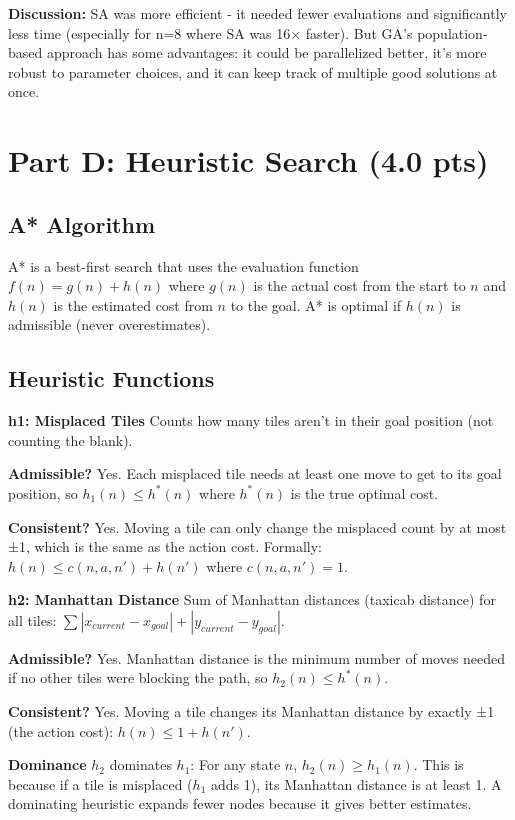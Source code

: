 \documentclass[letterpaper]{article}
\begin{document}
\textbf{Discussion:} SA was more efficient - it needed fewer evaluations and significantly less time (especially for n=8 where SA was 16× faster). But GA's population-based approach has some advantages: it could be parallelized better, it's more robust to parameter choices, and it can keep track of multiple good solutions at once.

\section{Part D: Heuristic Search (4.0 pts)}

\subsection{A* Algorithm}

A* is a best-first search that uses the evaluation function $f(n) = g(n) + h(n)$ where $g(n)$ is the actual cost from the start to $n$ and $h(n)$ is the estimated cost from $n$ to the goal. A* is optimal if $h(n)$ is admissible (never overestimates).

\subsection{Heuristic Functions}

\textbf{h1: Misplaced Tiles} Counts how many tiles aren't in their goal position (not counting the blank).

\textbf{Admissible?} Yes. Each misplaced tile needs at least one move to get to its goal position, so $h_1(n) \leq h^*(n)$ where $h^*(n)$ is the true optimal cost.

\textbf{Consistent?} Yes. Moving a tile can only change the misplaced count by at most ±1, which is the same as the action cost. Formally: $h(n) \leq c(n,a,n') + h(n')$ where $c(n,a,n') = 1$.

\textbf{h2: Manhattan Distance} Sum of Manhattan distances (taxicab distance) for all tiles: $\sum |x_{current} - x_{goal}| + |y_{current} - y_{goal}|$.

\textbf{Admissible?} Yes. Manhattan distance is the minimum number of moves needed if no other tiles were blocking the path, so $h_2(n) \leq h^*(n)$.

\textbf{Consistent?} Yes. Moving a tile changes its Manhattan distance by exactly ±1 (the action cost): $h(n) \leq 1 + h(n')$.

\textbf{Dominance} $h_2$ dominates $h_1$: For any state $n$, $h_2(n) \geq h_1(n)$. This is because if a tile is misplaced ($h_1$ adds 1), its Manhattan distance is at least 1. A dominating heuristic expands fewer nodes because it gives better estimates.
\end{document}
